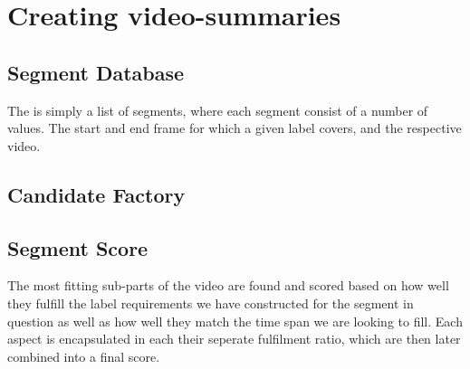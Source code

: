 %
\section{Creating video-summaries}
%

%
\subsection{Segment Database}
%
The is simply a list of segments, where each segment consist of a number of values. The start and end frame for which a given label covers, and the respective video.
%
\subsection{Candidate Factory}
%

%
\subsection{Segment Score}
%

The most fitting sub-parts of the video are found and scored based on how well they fulfill the label requirements we have constructed for the segment in question as well as how well they match the time span we are looking to fill. Each aspect is encapsulated in each their seperate fulfilment ratio, which are then later combined into a final score.\\

